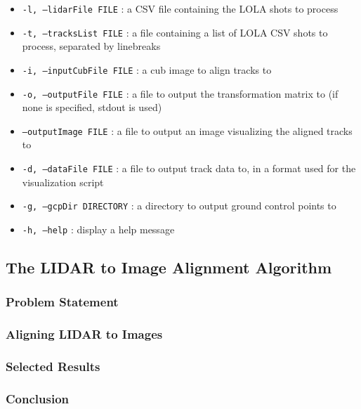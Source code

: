 \begin{itemize}
	\item{\texttt{-l, --lidarFile FILE}} : a CSV file containing the LOLA shots to process
	\item{\texttt{-t, --tracksList FILE}} : a file containing a list of LOLA CSV shots to process, separated by linebreaks
	\item{\texttt{-i, --inputCubFile FILE}} : a cub image to align tracks to
	\item{\texttt{-o, --outputFile FILE}} : a file to output the transformation matrix to (if none is specified, stdout is used)
	\item{\texttt{--outputImage FILE}} : a file to output an image visualizing the aligned tracks to
	\item{\texttt{-d, --dataFile FILE}} : a file to output track data to, in a format used for the visualization script
	\item{\texttt{-g, --gcpDir DIRECTORY}} : a directory to output ground control points to
	\item{\texttt{-h, --help}} : display a help message
\end{itemize}

\subsection{The LIDAR to Image Alignment Algorithm}


\subsubsection{Problem Statement}

\subsubsection{Aligning LIDAR to Images}

\subsubsection{Selected Results}

\subsubsection{Conclusion}


